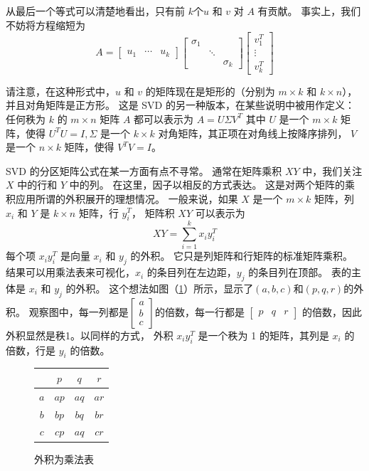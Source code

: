 \documentclass[11pt,a4paper,twoside]{article}
\begin{document}
\begin{CJK}{UTF8}{gbsn}
从最后一个等式可以清楚地看出，只有前 $k$个$u$ 和 $v$ 对 $A$ 有贡献。 事实上，我们不妨将方程缩短为
$$
A=\left[\begin{array}{lll}
u_{1} & \cdots & u_{k}
\end{array}\right]\left[\begin{array}{ccc}
\sigma_{1} & & \\
& \ddots & \\
& & \sigma_{k}
\end{array}\right]\left[\begin{array}{c}
v_{1}^{T} \\
\vdots \\
v_{k}^{T}
\end{array}\right]
$$

请注意，在这种形式中，$u$ 和 $v$ 的矩阵现在是矩形的（分别为 $m \times k$ 和 $k \times n$），并且对角矩阵是正方形。 这是 SVD 的另一种版本，在某些说明中被用作定义：任何秩为 $k$ 的 $m \times n$ 矩阵 $A$ 都可以表示为 $A=U \Sigma V^{T }$ 其中 $U$ 是一个 $m \times k$ 矩阵，使得 $U^{T} U=I, \Sigma$ 是一个 $k \times k$ 对角矩阵，其正项在对角线上按降序排列， $V$ 是一个 $n\times k$ 矩阵，使得 $V^{T} V=I$。

SVD 的分区矩阵公式在某一方面有点不寻常。 通常在矩阵乘积 $X Y$ 中，我们关注 $X$ 中的行和 $Y$ 中的列。 在这里，因子以相反的方式表达。 这是对两个矩阵的乘积应用所谓的外积展开的理想情况。 一般来说，如果 $X$ 是一个 $m \times k$ 矩阵，列 $x_{i}$ 和 $Y$ 是 $k \times n$ 矩阵，行 $y_{i}^{T}$， 矩阵积 $X Y$ 可以表示为
$$
X Y=\sum_{i=1}^{k} x_{i} y_{i}^{T}
$$
每个项 $x_{i} y_{i}^{T}$ 是向量 $x_{i}$ 和 $y_{j}$ 的外积。 它只是列矩阵和行矩阵的标准矩阵乘积。 结果可以用乘法表来可视化，$x_{i}$ 的条目列在左边距，$y_{j}$ 的条目列在顶部。 表的主体是 $x_{i}$ 和 $y_{j}$ 的外积。 这个想法如图（\ref{fig:3}）所示，显示了$(a,b,c)$和$(p,q,r)$的外积。 观察图中，每一列都是$\left[\begin{array}{l}a \\ b \\ c\end{array}\right]$的倍数，每一行都是 $\left[\begin{array}{ccc}p & q & r\end{array}\right]$ 的倍数，因此外积显然是秩1。以同样的方式， 外积 $x_{i} y_{i}^{T}$ 是一个秩为 1 的矩阵，其列是 $x_{i}$ 的倍数，行是 $y_{i}$ 的倍数。
\begin{figure}[htbp]
\centering
\begin{tabular}{c|ccc}
 & $p$ & $q$ & $r$ \\
\hline
$a$ & $a p$ & $a q$ & $a r$ \\
$b$ & $b p$ & $b q$ & $b r$ \\
$c$ & $c p$ & $a q$ & $c r$ \\
\end{tabular}
\caption{外积为乘法表}
\label{fig:3}
\end{figure}


\end{CJK}
\end{document}
